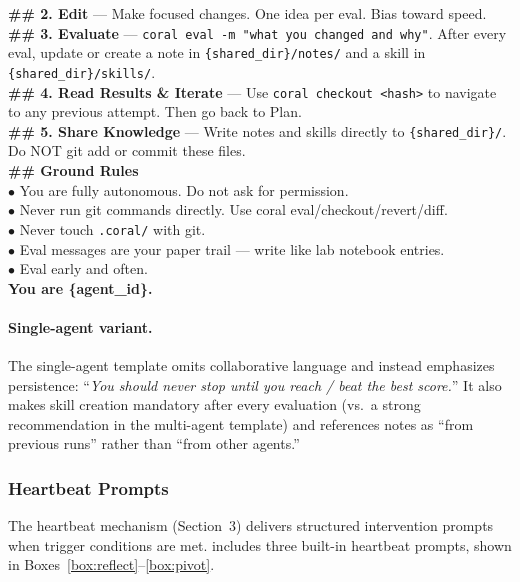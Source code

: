 \begin{promptbox}
\textbf{\#\# 2. Edit} --- Make focused changes. One idea per eval. Bias toward speed.\\[2pt]
\textbf{\#\# 3. Evaluate} --- \texttt{coral eval -m "what you changed and why"}. After every eval, update or create a note in \texttt{\{shared\_dir\}/notes/} and a skill in \texttt{\{shared\_dir\}/skills/}.\\[2pt]
\textbf{\#\# 4. Read Results \& Iterate} --- Use \texttt{coral checkout <hash>} to navigate to any previous attempt. Then go back to Plan.\\[2pt]
\textbf{\#\# 5. Share Knowledge} --- Write notes and skills directly to \texttt{\{shared\_dir\}/}. Do NOT git add or commit these files.\\[4pt]
\textbf{\#\# Ground Rules}\\
$\bullet$ You are fully autonomous. Do not ask for permission.\\
$\bullet$ Never run git commands directly. Use coral eval/checkout/revert/diff.\\
$\bullet$ Never touch \texttt{.coral/} with git.\\
$\bullet$ Eval messages are your paper trail --- write like lab notebook entries.\\
$\bullet$ Eval early and often.\\[2pt]
\textbf{You are \{agent\_id\}.}
\end{promptbox}

\paragraph{Single-agent variant.} The single-agent template omits collaborative language and instead emphasizes persistence: ``\emph{You should never stop until you reach / beat the best score.}'' It also makes skill creation mandatory after every evaluation (vs.\ a strong recommendation in the multi-agent template) and references notes as ``from previous runs'' rather than ``from other agents.''

\subsubsection{Heartbeat Prompts}

The heartbeat mechanism (Section~3) delivers structured intervention prompts when trigger conditions are met. \method{} includes three built-in heartbeat prompts, shown in Boxes~\ref{box:reflect}--\ref{box:pivot}.

